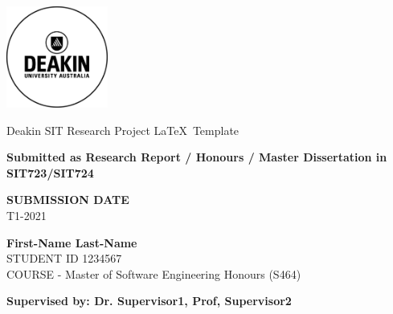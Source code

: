 \documentclass[12pt]{article}
\begin{document}
\onehalfspacing
\thispagestyle{empty} 
\begin{titlepage}
    \includegraphics[width=0.25\textwidth]{Deakin_Logo.jpeg}
    \begin{center}
       \vspace*{4cm}
       {\LARGE Deakin SIT Research Project \LaTeX~Template} %
       \vspace{3cm}
    \begin{large}   
    
        
        {\bf Submitted as Research Report / Honours / Master Dissertation in SIT723/SIT724}
       \vspace{1cm}
        
        {\bf SUBMISSION DATE} \\
        T1-2021        
        
       \vspace{3cm}
       \textbf{First-Name Last-Name}\\
       STUDENT ID 1234567 \\
       COURSE - Master of Software Engineering Honours (S464)
       \vfill

       {\bf \normalsize Supervised by: Dr. Supervisor1, Prof, Supervisor2}\\
       
    \end{large}  
   \end{center}
\end{titlepage}

\newpage 
\thispagestyle{plain} 


\newpage
\begin{singlespacing}
\tableofcontents
\end{singlespacing}
\setlength{\parskip}{1em}
\renewcommand{\baselinestretch}{2.0}

\newpage
\listoffigures
\listoftables

\newpage 
{}
\setcounter{page}{1}
\onehalfspacing










\newpage
\singlespacing

\end{document}
